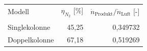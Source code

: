 \begin{tabular}{lrr}
\hline
Modell & $\eta_{N_2}$ [\%] & $\dot{n}_{\text{Produkt}} / \dot{n}_{\text{Luft}}$ [-] \\\\
\hline
Singlekolonne & 45,25 & 0,349732 \\
Doppelkolonne & 67,18 & 0,519269 \\
\hline
\end{tabular}
